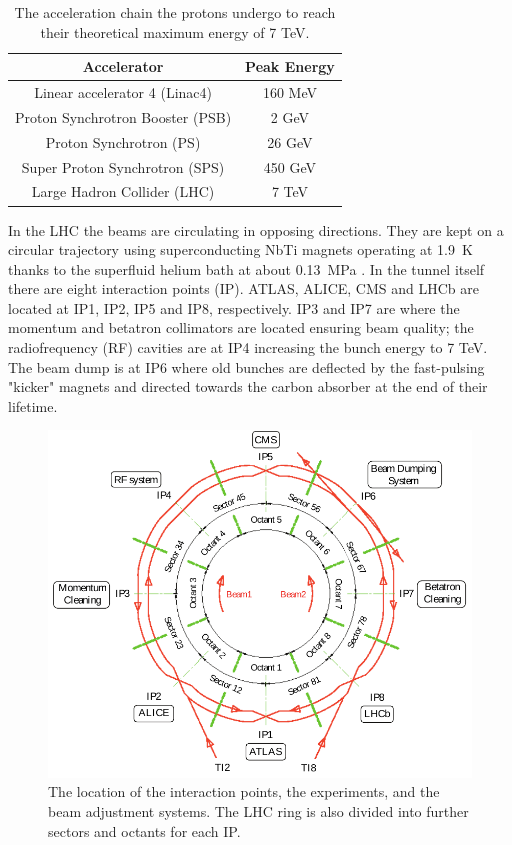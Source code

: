 \begin{table}[h!]
	\centering
	\begin{tabular}{c|c}
		Accelerator & Peak Energy \\
		\hline
		\hline
		Linear accelerator 4 (Linac4) & 160 MeV \\
		\hline
		Proton Synchrotron Booster (PSB) & 2 GeV \\
		\hline
		Proton Synchrotron (PS) & 26 GeV \\
		\hline
		Super Proton Synchrotron (SPS) & 450 GeV \\
		\hline
		Large Hadron Collider (LHC) & 7 TeV \\
	\end{tabular}
	\caption{The acceleration chain the protons undergo to reach their theoretical maximum energy of 7 TeV.}
	\label{tab:preaccelerators}
\end{table}

In the LHC the beams are circulating in opposing directions. They are kept on a circular trajectory using superconducting NbTi magnets operating at \SI{1.9}{\kelvin} thanks to the superfluid helium bath at about \SI{0.13}{\mega\pascal} \cite{Bruning:782076}. In the tunnel itself there are eight interaction points (IP). ATLAS, ALICE, CMS and LHCb are located at IP1, IP2, IP5 and IP8, respectively. IP3 and IP7 are where the momentum and betatron collimators are located ensuring beam quality; the radiofrequency (RF) cavities are at IP4 increasing the bunch energy to 7 TeV. The beam dump is at IP6 where old bunches are deflected by the fast-pulsing "kicker" magnets and directed towards the carbon absorber at the end of their lifetime. \cite{Evans_2008}

\begin{figure}[h!]
	\centering
	\includegraphics[width=0.6\linewidth]{figures/experiment/LHC_ring.pdf}
	\caption{The location of the interaction points, the experiments, and the beam adjustment systems. The LHC ring is also divided into further sectors and octants for each IP. \cite{Bracco:1174254}}
	\label{fig:LHC_ring}
\end{figure}

